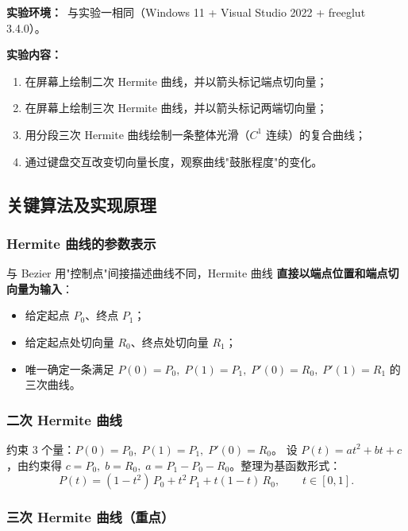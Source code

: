 \documentclass[a4paper,12pt]{ctexart}
\begin{document}
\textbf{实验环境：}\ 与实验一相同（Windows 11 + Visual Studio 2022 + freeglut 3.4.0）。

\textbf{实验内容：}
\begin{enumerate}[leftmargin=2em,itemsep=0.2em]
    \item 在屏幕上绘制二次 Hermite 曲线，并以箭头标记端点切向量；
    \item 在屏幕上绘制三次 Hermite 曲线，并以箭头标记两端切向量；
    \item 用分段三次 Hermite 曲线绘制一条整体光滑（$C^1$ 连续）的复合曲线；
    \item 通过键盘交互改变切向量长度，观察曲线"鼓胀程度"的变化。
\end{enumerate}

\subsection{关键算法及实现原理}

\subsubsection{Hermite 曲线的参数表示}

与 Bezier 用"控制点"间接描述曲线不同，Hermite 曲线 \textbf{直接以端点位置和端点切向量为输入}：

\begin{itemize}[leftmargin=2em,itemsep=0.1em]
    \item 给定起点 $P_0$、终点 $P_1$；
    \item 给定起点处切向量 $R_0$、终点处切向量 $R_1$；
    \item 唯一确定一条满足 $P(0)=P_0,\;P(1)=P_1,\;P'(0)=R_0,\;P'(1)=R_1$ 的三次曲线。
\end{itemize}

\subsubsection{二次 Hermite 曲线}

约束 $3$ 个量：$P(0)=P_0,\;P(1)=P_1,\;P'(0)=R_0$。
设 $P(t)=at^2+bt+c$，由约束得 $c=P_0,\;b=R_0,\;a=P_1-P_0-R_0$。整理为基函数形式：
\[
    P(t) = (1-t^2)\,P_0 + t^2\,P_1 + t(1-t)\,R_0,\qquad t\in[0,1].
\]

\subsubsection{三次 Hermite 曲线（重点）}
\end{document}
